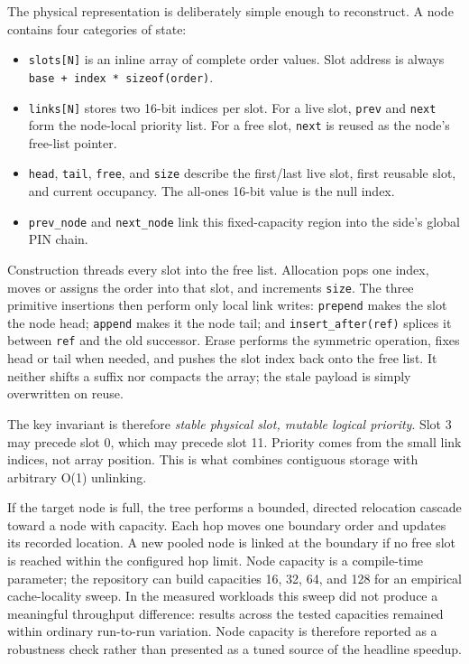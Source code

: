 \documentclass[10pt,twocolumn]{article}
\begin{document}
The physical representation is deliberately simple enough to reconstruct.  A
node contains four categories of state:
\begin{itemize}
  \item \texttt{slots[N]} is an inline array of complete order values.  Slot
        address is always \texttt{base + index * sizeof(order)}.
  \item \texttt{links[N]} stores two 16-bit indices per slot.  For a live slot,
        \texttt{prev} and \texttt{next} form the node-local priority list.  For a
        free slot, \texttt{next} is reused as the node's free-list pointer.
  \item \texttt{head}, \texttt{tail}, \texttt{free}, and \texttt{size} describe
        the first/last live slot, first reusable slot, and current occupancy.
        The all-ones 16-bit value is the null index.
  \item \texttt{prev\_node} and \texttt{next\_node} link this fixed-capacity
        region into the side's global PIN chain.
\end{itemize}
Construction threads every slot into the free list.  Allocation pops one index,
moves or assigns the order into that slot, and increments \texttt{size}.  The
three primitive insertions then perform only local link writes:
\texttt{prepend} makes the slot the node head; \texttt{append} makes it the node
tail; and \texttt{insert\_after(ref)} splices it between \texttt{ref} and the
old successor.  Erase performs the symmetric operation, fixes head or tail when
needed, and pushes the slot index back onto the free list.  It neither shifts a
suffix nor compacts the array; the stale payload is simply overwritten on reuse.

The key invariant is therefore \emph{stable physical slot, mutable logical
priority}.  Slot 3 may precede slot 0, which may precede slot 11.  Priority comes
from the small link indices, not array position.  This is what combines
contiguous storage with arbitrary O(1) unlinking.

If the target node is full, the tree performs a bounded, directed relocation
cascade toward a node with capacity.  Each hop moves one boundary order and
updates its recorded location.  A new pooled node is linked at the boundary if
no free slot is reached within the configured hop limit.  Node capacity is a
compile-time parameter; the repository can build capacities 16, 32, 64, and 128
for an empirical cache-locality sweep.  In the measured workloads this sweep
did not produce a meaningful throughput difference: results across the tested
capacities remained within ordinary run-to-run variation.  Node capacity is
therefore reported as a robustness check rather than presented as a tuned source
of the headline speedup.
\end{document}
